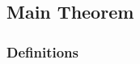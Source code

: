 \subsection{Main Theorem}
\subsubsection*{Definitions}
\begin{comment}
Let $R$ be a commutative ring (with 	$). An algebra $(A,\iota)$ over $R$ is an associative ring $A$ with 	$ equipped with an embedding $\iota : R \to A$ of rings, mapping 	 \in R$ to 	 \in A$ such that $\iota(R)$ is contained in the center of $A$. Using $\iota$, we identify $R$ with a central subring of $A$ and suppress reference to $\iota$.

A \textbf{standard involution} on $B$ is an anti-involution $\overline{\cdot}: A \to A$ such that $x\overline{x} \in A$ for all $x\in A$. Given a standard involution on $A$, define the \textbf{reduced trace},\textbf{reduced norm}, and \textbf{characteristic polynomial} of an element of $A$ by
\begin{align*}
	\trd:         & A \to R, \quad \trd(x)    & = x + \overline{x}         \\
	\nrd:         & A \to R, \quad \nrd(x)    & = x\overline{x}            \\
	\mu(\cdot;T): & A \to R[T] \quad \mu(x;T) & = T^2 - \tr(x) T +\nrd(x).
\end{align*}

\end{comment}
\begin{comment}
In this section $R$ is an integral domain, and $k$ is its field of fractions, and $A$ a finite dimensional algebra over $k$ with unit element 	_A$. A finitely generated $R$-submodule $M$ of $A$ is a \textbf{lattice}, and is \textbf{full} if $kM=A$. A full lattice in $A$ is an \textbf{order} if it is a subring containing 	_A$.

Given a full lattice $M$ in $A$, the sets
\begin{align*}
	\Ocal_\ell(M)= \{ x \in A: xM \subset M\} \\
	\Ocal_r(M)= \{ x \in A: Mx \subset M\}
\end{align*}
are orders in $A$, and are called the \textbf{left}/\textbf{right} orders of $M$ respectively.
\begin{defn}

\end{defn}

\end{comment}
